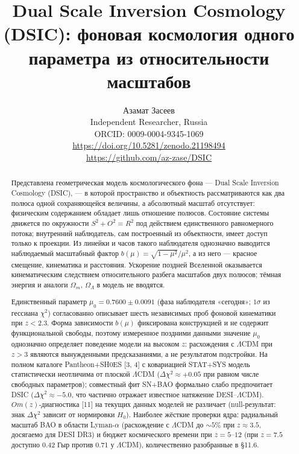 \documentclass{article}
\begin{document}
\title{Dual Scale Inversion Cosmology (DSIC): фоновая космология одного параметра из относительности масштабов}

\author{Азамат Засеев\\
Independent Researcher, Russia\\
ORCID: 0009-0004-9345-1069\\
\url{https://doi.org/10.5281/zenodo.21198494}\\
\url{https://github.com/az-zase/DSIC}}

\date{}
\maketitle

\begin{abstract}
Представлена геометрическая модель космологического фона --- Dual Scale Inversion Cosmology (DSIC), --- в которой пространство и объектность рассматриваются как два полюса одной сохраняющейся величины, а абсолютный масштаб отсутствует: физическим содержанием обладает лишь отношение полюсов. Состояние системы движется по окружности $S^2 + O^2 = R^2$ под действием единственного равномерного потока; внутренний наблюдатель, сам построенный из объектности, имеет доступ только к проекции. Из линейки и часов такого наблюдателя однозначно выводится наблюдаемый масштабный фактор $b(\mu) = \sqrt{1-\mu^2}/\mu^2$, а из него --- красное смещение, кинематика и расстояния. Ускорение поздней Вселенной оказывается кинематическим следствием относительного разбега масштабов двух полюсов; тёмная энергия и аналоги $\Omega_m$, $\Omega_\Lambda$ в модель не вводятся.

Единственный параметр $\mu_0 = 0.7600 \pm 0.0091$ (фаза наблюдателя «сегодня»; $1\sigma$ из гессиана $\chi^2$) согласованно описывает шесть независимых проб фоновой кинематики при $z < 2.3$. Форма зависимости $b(\mu)$ фиксирована конструкцией и не содержит функциональной свободы, поэтому измеренное поздними данными значение $\mu_0$ однозначно определяет поведение модели на высоком $z$: расхождения с $\Lambda$CDM при $z > 3$ являются вынужденными предсказаниями, а не результатом подстройки. На полном каталоге Pantheon+SH0ES [3, 4] с ковариацией STAT+SYS модель статистически неотличима от плоской $\Lambda$CDM ($\Delta\chi^2 \approx +0.05$ при равном числе свободных параметров); совместный фит SN+BAO формально слабо предпочитает DSIC ($\Delta\chi^2 \approx -5.0$, что частично отражает известное натяжение DESI--$\Lambda$CDM). $Om(z)$-диагностика [11] на текущих данных моделей не различает (null-результат: знак $\Delta\chi^2$ зависит от нормировки $H_0$). Наиболее жёсткие проверки ядра: радиальный масштаб BAO в области Lyman-$\alpha$ (расхождение с $\Lambda$CDM до ${\sim}5\%$ при $z \approx 3.5$, досягаемо для DESI DR3) и бюджет космического времени при $z = 5\text{--}12$ (при $z = 7.5$ доступно 0.42 Гыр против 0.71 у $\Lambda$CDM), количественно разобранные в \S11.6.


\end{abstract}
\end{document}
